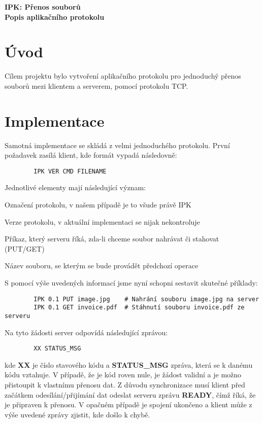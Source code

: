 \documentclass[10pt,a4paper]{article}
\begin{document}
\begin{center}
	\Large{\textbf{IPK: Přenos souborů}} \\
	\textbf{Popis aplikačního protokolu}
\end{center}
	
\section{Úvod}
	Cílem projektu bylo vytvoření aplikačního protokolu pro jednoduchý přenos souborů mezi klientem a serverem, pomocí protokolu TCP.
\section{Implementace}
	Samotná implementace se skládá z velmi jednoduchého protokolu. První požadavek zasílá klient, kde formát vypadá následovně:
	\begin{verbatim}
		IPK VER CMD FILENAME
	\end{verbatim}
	
	Jednotlivé elementy mají následující význam:
	\begin{description}[labelindent=1cm]
		\item[IPK] Označení protokolu, v našem případě je to všude právě IPK
		\item[VER] Verze protokolu, v aktuální implementaci se nijak nekontroluje
		\item[CMD] Příkaz, který serveru říká, zda-li chceme soubor nahrávat či stahovat (PUT/GET)
		\item[FILENAME] Název souboru, se kterým se bude provádět předchozí operace
	\end{description}
	
	S pomocí výše uvedených informací jsme nyní schopni sestavit skutečné příklady:
	\begin{verbatim}
		IPK 0.1 PUT image.jpg    # Nahrání souboru image.jpg na server 
		IPK 0.1 GET invoice.pdf  # Stáhnutí souboru invoice.pdf ze serveru
	\end{verbatim}
		
	\noindent Na tyto žádosti server odpovídá následující zprávou:
	\begin{verbatim}
		XX STATUS_MSG
	\end{verbatim}
	
	kde \textbf{XX} je číslo stavového kódu a \textbf{STATUS\_MSG} zpráva, která se k danému kódu vztahuje. V případě, že je kód roven nule, je žádost validní a je možno přistoupit k vlastnímu přenosu dat. Z důvodu synchronizace musí klient před začátkem odesílání/přijímání dat odeslat serveru zprávu \textbf{READY}, čímž říká, že je připraven k přenosu. V opačném případě je spojení ukončeno a klient může z výše uvedené zprávy zjistit, kde došlo k chybě.
	
\end{document}
